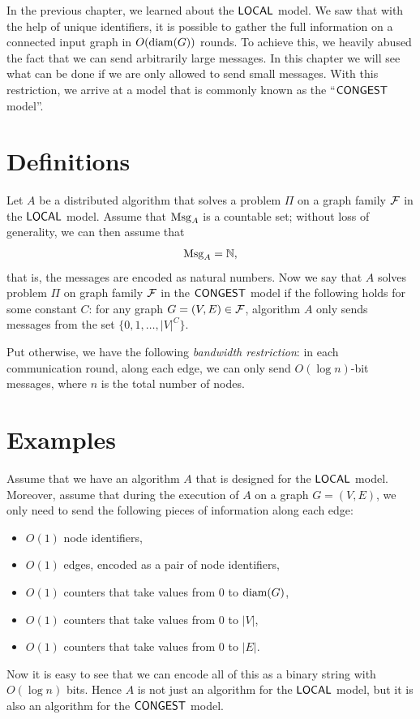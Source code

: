 
In the previous chapter, we learned about the $\textup{\sffamily LOCAL}$ model. We saw that with the help of unique identifiers, it is possible to gather the full information on a connected input graph in $O(\operatorname{diam}(G))$ rounds. To achieve this, we heavily abused the fact that we can send arbitrarily large messages. In this chapter we will see what can be done if we are only allowed to send small messages. With this restriction, we arrive at a model that is commonly known as the ``$\textup{\sffamily CONGEST}$ model''.


\section{Definitions}\label{sec:congest}

Let $A$ be a distributed algorithm that solves a problem $\Pi$ on a graph family $\mathcal{F}$ in the $\textup{\sffamily LOCAL}$ model. Assume that $\operatorname{Msg}_A$ is a countable set; without loss of generality, we can then assume that
\[
    \operatorname{Msg}_A = \mathbb{N},
\]
that is, the messages are encoded as natural numbers. Now we say that $A$ solves problem $\Pi$ on graph family $\mathcal{F}$ in the $\textup{\sffamily CONGEST}$ model if the following holds for some constant $C$: for any graph $G = (V,E) \in \mathcal{F}$, algorithm $A$ only sends messages from the set $\{0, 1, \dotsc, |V|^C\}$.

Put otherwise, we have the following \emph{bandwidth restriction}: in each communication round, along each edge, we can only send $O(\log n)$-bit messages, where $n$ is the total number of nodes.


\section{Examples}

Assume that we have an algorithm $A$ that is designed for the $\textup{\sffamily LOCAL}$ model. Moreover, assume that during the execution of $A$ on a graph $G = (V,E)$, we only need to send the following pieces of information along each edge:
\begin{itemize}[noitemsep]
    \item $O(1)$ node identifiers,
    \item $O(1)$ edges, encoded as a pair of node identifiers,
    \item $O(1)$ counters that take values from $0$ to $\operatorname{diam}(G)$,
    \item $O(1)$ counters that take values from $0$ to $|V|$,
    \item $O(1)$ counters that take values from $0$ to $|E|$.
\end{itemize}
Now it is easy to see that we can encode all of this as a binary string with $O(\log n)$ bits. Hence $A$ is not just an algorithm for the $\textup{\sffamily LOCAL}$ model, but it is also an algorithm for the $\textup{\sffamily CONGEST}$ model.

